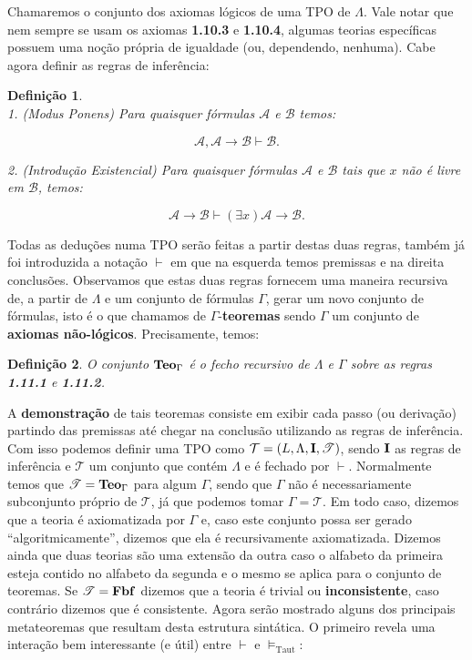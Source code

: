 \documentclass[11pt,a4paper]{article}
\newtheorem{mydef}{Definição}[section]
\theoremstyle{definition}
\begin{document}
Chamaremos o conjunto dos axiomas lógicos de uma TPO de $\Lambda$. Vale notar que nem sempre se usam os axiomas \textbf{1.10.3} e \textbf{1.10.4}, algumas teorias específicas possuem uma noção própria de igualdade (ou, dependendo, nenhuma). Cabe agora definir as regras de inferência: 

\begin{mydef} \ \\
	
	1. (Modus Ponens) Para quaisquer fórmulas $\mathscr{A}$ e $\mathscr{B}$ temos: 
	
	$$\mathscr{A}, \mathscr{A}\rightarrow \mathscr{B}\vdash \mathscr{B}.$$
	
	2. (Introdução Existencial) Para quaisquer fórmulas $\mathscr{A}$ e $\mathscr{B}$ tais que $x$ não é livre em  $\mathscr{B}$, temos:
	
	$$  \mathscr{A}\rightarrow \mathscr{B}\vdash (\exists x) \mathscr{A}\rightarrow \mathscr{B} .$$
	
	
	
\end{mydef}

Todas as deduções numa TPO serão feitas a partir destas duas regras, também já foi introduzida a notação $\vdash$ em que na esquerda temos premissas e na direita conclusões. Observamos que estas duas regras fornecem uma maneira recursiva de, a partir de $\Lambda$ e um conjunto de fórmulas $\Gamma$, gerar um novo conjunto de fórmulas, isto é o que chamamos de $\Gamma$-\textbf{teoremas} sendo $\Gamma$ um conjunto de \textbf{axiomas não-lógicos}. Precisamente, temos: 

\begin{mydef}
	
	O conjunto  $\textrm{\textbf{Teo}}_\Gamma$ é o fecho recursivo de $\Lambda$ e $\Gamma$ sobre as regras  \textbf{1.11.1} e \textbf{1.11.2}.
	
\end{mydef}

A \textbf{demonstração} de tais teoremas consiste em exibir cada passo (ou derivação) partindo das premissas até chegar na conclusão utilizando as regras de inferência. Com isso podemos definir uma TPO como $\mathcal{T}=(L,\Lambda,\textrm{\textbf{I}},\mathscr{T})$, sendo $\textrm{\textbf{I}}$ as regras de inferência e $\mathscr{T}$ um conjunto que contém $\Lambda$ e é fechado por $\vdash$. Normalmente temos que $\mathscr{T}=\textrm{\textbf{Teo}}_\Gamma$ para algum $\Gamma$, sendo que $\Gamma$ não é necessariamente subconjunto próprio de $\mathscr{T}$, já que podemos tomar $\Gamma=\mathscr{T}$. Em todo caso, dizemos que a teoria é axiomatizada por $\Gamma$ e, caso este conjunto possa ser gerado ``algoritmicamente'', dizemos que ela é recursivamente axiomatizada. Dizemos ainda que duas teorias são uma extensão da outra caso o alfabeto da primeira esteja contido no alfabeto da segunda e o mesmo se aplica para o conjunto de teoremas. Se $\mathscr{T}=\textrm{\textbf{Fbf}}$ dizemos que a teoria é trivial ou \textbf{inconsistente}, caso contrário dizemos que é consistente. Agora serão mostrado alguns dos principais metateoremas que resultam desta estrutura sintática. O primeiro revela uma interação bem interessante (e útil) entre $\vdash$ e $\vDash_{\textrm{Taut}}$:
\end{document}
